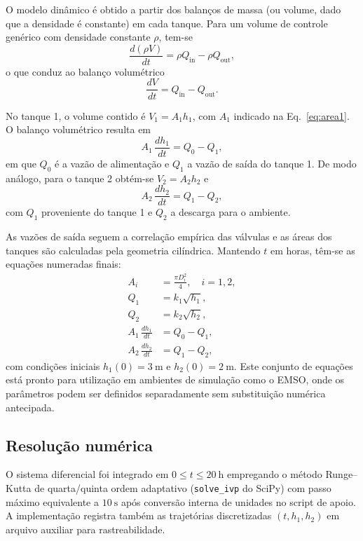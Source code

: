 \documentclass{article}
\begin{document}
O modelo dinâmico é obtido a partir dos balanços de massa (ou volume, dado que a densidade é constante) em cada tanque. Para um volume de controle genérico com densidade constante $\rho$, tem-se
\begin{equation*}
  \frac{d(\rho V)}{dt} = \rho Q_{\text{in}} - \rho Q_{\text{out}},
\end{equation*}
o que conduz ao balanço volumétrico
\begin{equation*}
  \frac{dV}{dt} = Q_{\text{in}} - Q_{\text{out}}.
\end{equation*}

No tanque 1, o volume contido é $V_1 = A_1 h_1$, com $A_1$ indicado na Eq.~\eqref{eq:area1}. O balanço volumétrico resulta em
\begin{equation*}
  A_1\,\frac{dh_1}{dt} = Q_0 - Q_1,
\end{equation*}
em que $Q_0$ é a vazão de alimentação e $Q_1$ a vazão de saída do tanque 1. De modo análogo, para o tanque 2 obtém-se $V_2 = A_2 h_2$ e
\begin{equation*}
  A_2\,\frac{dh_2}{dt} = Q_1 - Q_2,
\end{equation*}
com $Q_1$ proveniente do tanque 1 e $Q_2$ a descarga para o ambiente.

As vazões de saída seguem a correlação empírica das válvulas e as áreas dos tanques são calculadas pela geometria cilíndrica. Mantendo $t$ em horas, têm-se as equações numeradas finais:
\begin{align}
  A_i &= \frac{\pi D_i^2}{4}, \quad i = 1,2, \label{eq:area1} \\
  Q_1 &= k_1 \sqrt{h_1}, \label{eq:Q1} \\
  Q_2 &= k_2 \sqrt{h_2}, \label{eq:Q2} \\
  A_1\,\frac{dh_1}{dt} &= Q_0 - Q_1, \label{eq:balanco1} \\
  A_2\,\frac{dh_2}{dt} &= Q_1 - Q_2, \label{eq:balanco2}
\end{align}
com condições iniciais $h_1(0) = 3\ \mathrm{m}$ e $h_2(0) = 2\ \mathrm{m}$. Este conjunto de equações está pronto para utilização em ambientes de simulação como o EMSO, onde os parâmetros podem ser definidos separadamente sem substituição numérica antecipada.

\subsection*{Resolução numérica}
O sistema diferencial foi integrado em $0 \leq t \leq 20\ \mathrm{h}$ empregando o método Runge--Kutta de quarta/quinta ordem adaptativo (\texttt{solve\_ivp} do SciPy) com passo máximo equivalente a $10\ \mathrm{s}$ após conversão interna de unidades no script de apoio. A implementação registra também as trajetórias discretizadas $(t, h_1, h_2)$ em arquivo auxiliar para rastreabilidade.
\end{document}
